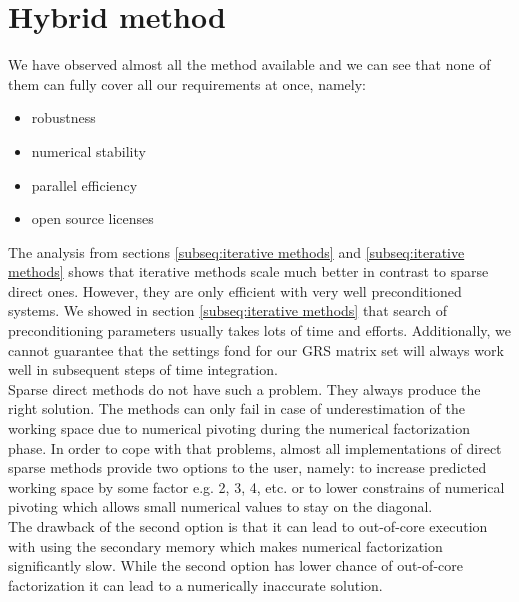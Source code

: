 \section{Hybrid method}
\label{subseq:choice-and-motivation}

We have observed almost all the method available and we can see that none of them can fully cover all our requirements at once, namely:

\begin{itemize}
	\item robustness
	\item numerical stability
	\item parallel efficiency
	\item open source licenses
\end{itemize}


The analysis from sections \ref{subseq:iterative methods} and \ref{subseq:iterative methods} shows that iterative methods scale much better in contrast to sparse direct ones. However, they are only efficient with very well preconditioned systems. We showed in section \ref{subseq:iterative methods} that search of preconditioning parameters usually takes lots of time and efforts. Additionally, we cannot guarantee that the settings fond for our GRS matrix set will always work well in subsequent steps of time integration.\\


Sparse direct methods do not have such a problem. They always produce the right solution. The methods can only fail in case of underestimation of the working space due to numerical pivoting during the numerical factorization phase. In order to cope with that problems, almost all implementations of direct sparse methods provide two options to the user, namely: to increase predicted working space by some factor e.g. 2, 3, 4, etc. or to lower constrains of numerical pivoting which allows small numerical values to stay on the diagonal.\\


The drawback of the second option is that it can lead to out-of-core execution with using the secondary memory which makes numerical factorization significantly slow. While the second option has lower chance of out-of-core factorization it can lead to a numerically inaccurate solution. \\


